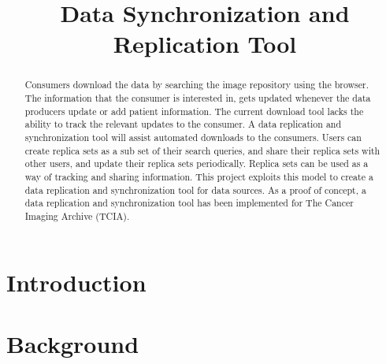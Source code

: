 \documentclass[conference]{IEEEtran}
\begin{document}
\title{Data Synchronization and Replication Tool}

\author{
\and
{}
}
\maketitle

\begin{abstract}
Consumers download the data by searching the image repository using the browser. The information that the consumer is interested in, gets updated whenever the data producers update or add patient information. The current download tool lacks the ability to track the relevant updates to the consumer. A data replication and synchronization tool will assist automated downloads to the consumers. Users can create replica sets as a sub set of their search queries, and share their replica sets with other users, and update their replica sets periodically. Replica sets can be used as a way of tracking and sharing information. This project exploits this model to create a data replication and synchronization tool for data sources. As a proof of concept, a data replication and synchronization tool has been implemented for The Cancer Imaging Archive (TCIA).
\end{abstract}

\IEEEpeerreviewmaketitle

\section{Introduction}
\section{Background}
\balance
\end{document}
